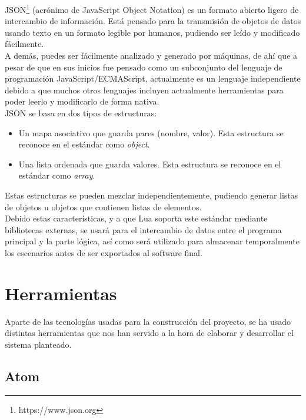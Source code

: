 JSON\footnote{https://www.json.org} (acrónimo de JavaScript Object Notation) es un formato abierto \cite{JSON} ligero de intercambio de información. Está pensado para la transmisión de objetos de datos usando texto en un formato legible por humanos, pudiendo ser leído y modificado fácilmente. \\

A demás, puedes ser fácilmente analizado y generado por máquinas, de ahí que a pesar de que en sus inicios fue pensado como un subconjunto del lenguaje de programación JavaScript/ECMAScript, actualmente es un lenguaje independiente debido a que muchos otros lenguajes incluyen actualmente herramientas para poder leerlo y modificarlo de forma nativa. \\

JSON se basa en dos tipos de estructuras:

\begin{itemize}
	\item Un mapa asociativo que guarda pares (nombre, valor). Esta estructura se reconoce en el estándar como \textit{object}.
	\item Una lista ordenada que guarda valores. Esta estructura se reconoce en el estándar como \textit{array}.
\end{itemize}

Estas estructuras se pueden mezclar independientemente, pudiendo generar listas de objetos u objetos que contienen listas de elementos. \\

Debido estas características, y a que Lua soporta este estándar mediante bibliotecas externas, se usará para el intercambio de datos entre el programa principal y la parte lógica, así como será utilizado para almacenar temporalmente los escenarios antes de ser exportados al software final.

\section{Herramientas}

Aparte de las tecnologías usadas para la construcción del proyecto, se ha usado distintas herramientas que nos han servido a la hora de elaborar y desarrollar el sistema planteado.

\subsection{Atom}

